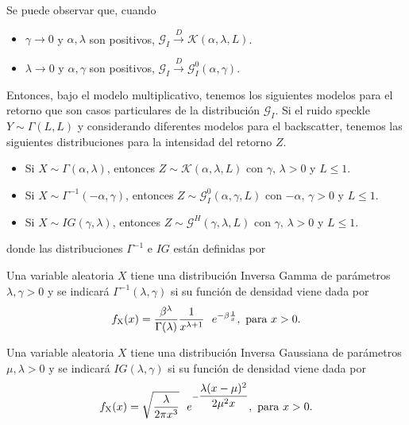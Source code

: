 Se puede observar que, cuando 
\begin{itemize}
	\item $\gamma \longrightarrow 0$ y $\alpha,\lambda$ son positivos, $\mathcal{G}_I \stackrel{D}{\longrightarrow}\mathcal{K}(\alpha,\lambda,L)$.
	\item $\lambda \longrightarrow 0$ y $\alpha,\gamma$ son positivos, $\mathcal{G}_I\stackrel{D}{\longrightarrow}\mathcal{G}_I^0(\alpha,\gamma)$.
\end{itemize}

Entonces, bajo el modelo multiplicativo, tenemos los siguientes modelos para el retorno que son casos particulares de la distribución $\mathcal{G}_I$. Si el ruido speckle $Y \sim \Gamma(L,L)$ y considerando diferentes modelos para el backscatter, tenemos las siguientes distribuciones para la intensidad del retorno $Z$.
\begin{itemize}
	\item Si $X \sim \Gamma(\alpha,\lambda)$, entonces $Z \sim \mathcal{K}(\alpha,\lambda,L)$ con $\gamma, \, \lambda >0$ y $L \leq 1$.
	\item Si $X \sim \Gamma^{-1}(-\alpha,\gamma)$, entonces $Z \sim \mathcal{G}_I^0(\alpha,\gamma,L)$ con $-\alpha, \, \gamma >0$ y $L \leq 1$.
	\item Si $X\sim IG(\gamma,\lambda)$, entonces $Z \sim \mathcal{G}^H(\gamma,\lambda,L)$ con $\gamma, \, \lambda >0$ y $L \leq 1$.
\end{itemize}

donde las distribuciones $\Gamma^{-1}$ e $IG$ están definidas por

\begin{definition}
	\label{InversaGamma}
	Una variable aleatoria $X$ tiene una distribución Inversa Gamma de parámetros $\lambda, \gamma >0$  y se indicará $\Gamma^{-1}(\lambda,\gamma)$ si su función de densidad viene dada por
	\begin{align}
	f_{\text X}(x)=\dfrac{\beta^{\lambda}}{\Gamma(\lambda)} \dfrac{1}{x^{\lambda+1}} \ \ e^{-\beta \frac{1}{x}}, \text{ para } x>0.
	\end{align}
\end{definition}

\begin{definition}
	\label{InversaGaussiana}
	Una variable aleatoria $X$ tiene una distribución Inversa Gaussiana de parámetros $\mu, \lambda >0$  y se indicará $IG(\lambda,\gamma)$ si su función de densidad viene dada por
	\begin{align}
	f_{\text X}(x)=\sqrt{\dfrac{\lambda}{2 \pi x^3}} \ \ e^{- \dfrac{\lambda (x-\mu)^2}{2 \mu^2 x}}, \text{ para } x>0.
		\end{align}
	\end{definition}

